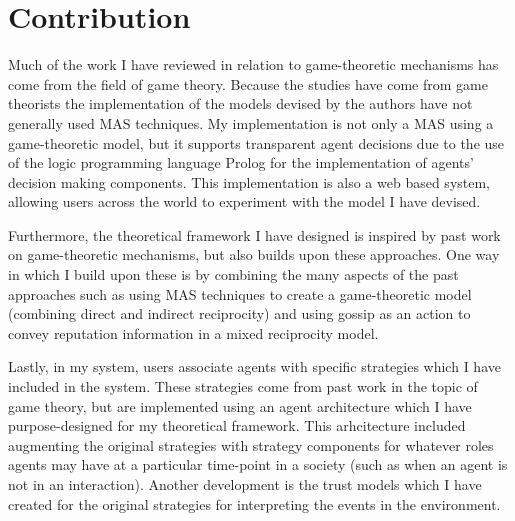 \documentclass[]{final_report}
\begin{document}
\section{Contribution}
Much of the work I have reviewed in relation to game-theoretic mechanisms has come from the field of game theory. Because the studies have come from game theorists the implementation of the models devised by the authors have not generally used MAS techniques. My implementation is not only a MAS using a game-theoretic model, but it supports transparent agent decisions due to the use of the logic programming language Prolog for the implementation of agents' decision making components. This implementation is also a web based system, allowing users across the world to experiment with the model I have devised.\par
Furthermore, the theoretical framework I have designed is inspired by past work on game-theoretic mechanisms, but also builds upon these approaches. One way in which I build upon these is by combining the many aspects of the past approaches such as using MAS techniques to create a game-theoretic model (combining direct and indirect reciprocity) and using gossip as an action to convey reputation information in a mixed reciprocity model.\par
Lastly, in my system, users associate agents with specific strategies which I have included in the system. These strategies come from past work in the topic of game theory, but are implemented using an agent architecture which I have purpose-designed for my theoretical framework. This arhcitecture included augmenting the original strategies with strategy components for whatever roles agents may have at a particular time-point in a society (such as when an agent is not in an interaction). Another development is the trust models which I have created for the original strategies for interpreting the events in the environment.
\end{document}
